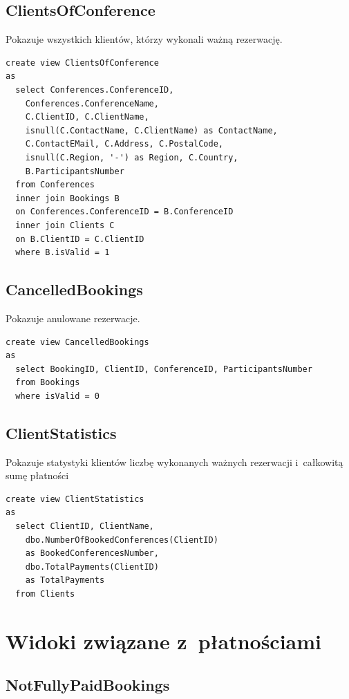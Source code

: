 \documentclass[12pt, a4paper]{mwrep}
\begin{document}
\subsection{ClientsOfConference}

\noindent Pokazuje wszystkich klientów, którzy wykonali ważną rezerwację.

\begin{lstlisting}
create view ClientsOfConference
as
  select Conferences.ConferenceID, 
    Conferences.ConferenceName, 
    C.ClientID, C.ClientName,
    isnull(C.ContactName, C.ClientName) as ContactName, 
    C.ContactEMail, C.Address, C.PostalCode, 
    isnull(C.Region, '-') as Region, C.Country,
    B.ParticipantsNumber
  from Conferences
  inner join Bookings B 
  on Conferences.ConferenceID = B.ConferenceID
  inner join Clients C 
  on B.ClientID = C.ClientID
  where B.isValid = 1
\end{lstlisting}

\subsection{CancelledBookings}

\noindent Pokazuje anulowane rezerwacje.

\begin{lstlisting}
create view CancelledBookings
as
  select BookingID, ClientID, ConferenceID, ParticipantsNumber
  from Bookings
  where isValid = 0
\end{lstlisting}

\subsection{ClientStatistics}

\noindent Pokazuje statystyki klientów \ppauza liczbę wykonanych ważnych rezerwacji i~całkowitą sumę płatności

\begin{lstlisting}
create view ClientStatistics
as
  select ClientID, ClientName, 
    dbo.NumberOfBookedConferences(ClientID) 
    as BookedConferencesNumber, 
    dbo.TotalPayments(ClientID) 
    as TotalPayments
  from Clients
\end{lstlisting}

\section{Widoki związane z~płatnościami}

\subsection{NotFullyPaidBookings}
\end{document}
